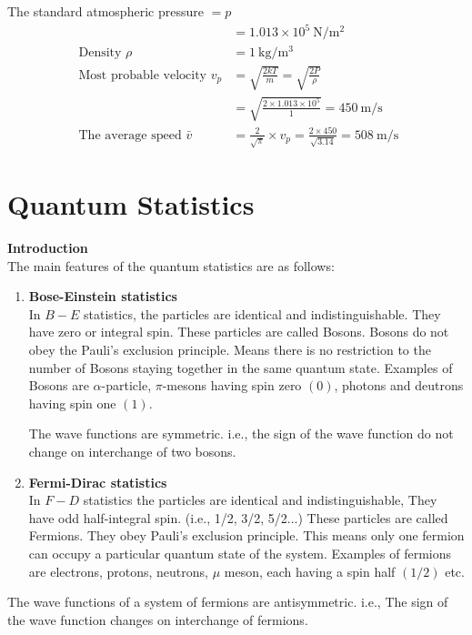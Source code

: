 \begin{answer}
	The standard atmospheric pressure $=p$
	\begin{align*}
	&=1.013 \times 10^{5} \mathrm{~N} / \mathrm{m}^{2}\\
	\text { Density } \rho&=1 \mathrm{~kg} / \mathrm{m}^{3}\\
	\text { Most probable velocity } v_{p}&=\sqrt{\frac{2 k T}{m}}=\sqrt{\frac{2 P}{\rho}}\\
	&=\sqrt{\frac{2 \times 1.013 \times 10^{5}}{1}}=450 \mathrm{~m} / \mathrm{s}\\
	\text { The average speed } \bar{v}&=\frac{2}{\sqrt{\pi}} \times v_{p}=\frac{2 \times 450}{\sqrt{3.14}}=508 \mathrm{~m} / \mathrm{s}
	\end{align*}
\end{answer}
\section{Quantum Statistics}
\textbf{Introduction}\\
The main features of the quantum statistics are as follows:
\begin{enumerate}
	\item \textbf{ Bose-Einstein statistics}\\
In $B-E$ statistics, the particles are identical and indistinguishable. They have zero or integral spin. These particles are called Bosons. Bosons do not obey the Pauli's exclusion principle. Means there is no restriction to the number of Bosons staying together in the same quantum state. Examples of Bosons are $\alpha$-particle, $\pi$-mesons having spin zero $(0)$, photons and deutrons having spin one $(1)$.\\
\par The wave functions are symmetric. i.e., the sign of the wave function do not change on interchange of two bosons.
\item 
\textbf{ Fermi-Dirac statistics}\\
In $F-D$ statistics the particles are identical and indistinguishable, They have odd half-integral spin. (i.e., 1/2, 3/2, 5/2...) These particles are called Fermions. They obey Pauli's exclusion principle. This means only one fermion can occupy a particular quantum state of the system. Examples of fermions are electrons, protons, neutrons, $\mu$ meson, each having a spin half $(1 / 2)$ etc.
\end{enumerate}
\par The wave functions of a system of fermions are antisymmetric. i.e., The sign of the wave function changes on interchange of fermions.\\
